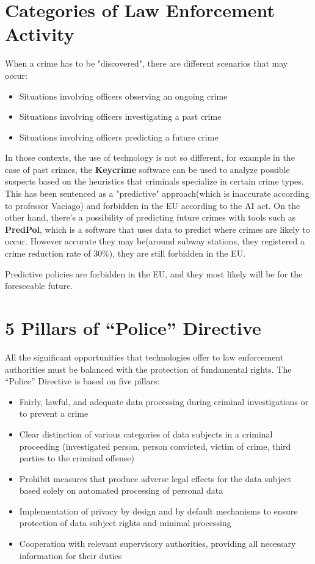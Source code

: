 \section{Categories of Law Enforcement Activity}
When a crime has to be "discovered", there are different scenarios
that may occur:

\begin{itemize}
    \item Situations involving officers observing an ongoing crime
    \item Situations involving officers investigating a past crime
    \item Situations involving officers predicting a future crime
\end{itemize}

In those contexts, the use of technology is not so different, for
example in the case of past crimes, the \textbf{Keycrime} software can
be used to analyze possible suspects based on the heuristics that
criminals specialize in certain crime types. This has been sentenced
as a "predictive" approach(which is inaccurate according to professor
Vaciago) and forbidden in the EU according to the AI act. On the other
hand, there's a possibility of predicting future crimes with tools
such as \textbf{PredPol}, which is a software that uses data to
predict where crimes are likely to occur. However accurate they may
be(around subway stations, they registered a crime reduction rate of
30\%), they are still forbidden in the EU.

\begin{boxH}
  Predictive policies are forbidden in the EU, and they most likely
  will be for the foreseeable future.
\end{boxH}



\section{5 Pillars of “Police” Directive}
All the significant opportunities that technologies offer to law 
enforcement authorities must be balanced with the protection of 
fundamental rights. The “Police” Directive is based on five pillars:

\begin{itemize}
    \item Fairly, lawful, and adequate data processing during criminal
      investigations or to prevent a crime
    \item Clear distinction of various categories of data subjects in
      a criminal proceeding (investigated person, person convicted,
      victim of crime, third parties to the criminal offense)
    \item Prohibit measures that produce adverse legal effects for the
      data subject based solely on automated processing of personal
      data
    \item Implementation of privacy by design and by default
      mechanisms to ensure protection of data subject rights and
      minimal processing
    \item Cooperation with relevant supervisory authorities, providing
      all necessary information for their duties
\end{itemize}

